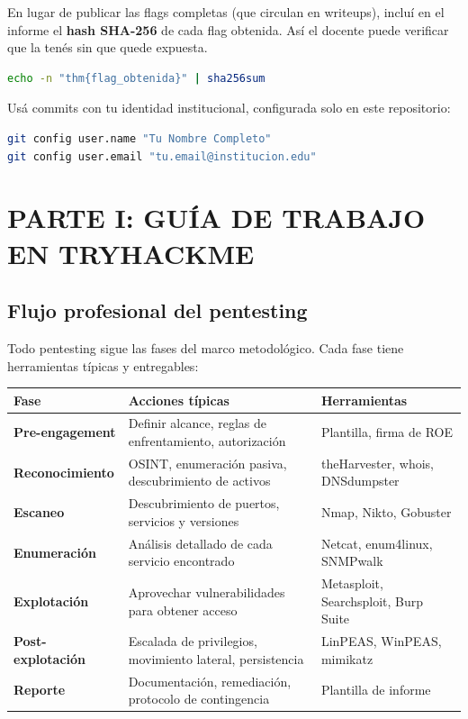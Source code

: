\documentclass[11pt,a4paper]{article}
\begin{document}
\begin{control}
En lugar de publicar las flags completas (que circulan en writeups), incluí en el informe el \textbf{hash SHA-256} de cada flag obtenida. Así el docente puede verificar que la tenés sin que quede expuesta.
\begin{lstlisting}[language=bash]
echo -n "thm{flag_obtenida}" | sha256sum
\end{lstlisting}
\end{control}

\begin{control}
Usá commits con tu identidad institucional, configurada solo en este repositorio:
\begin{lstlisting}[language=bash]
git config user.name "Tu Nombre Completo"
git config user.email "tu.email@institucion.edu"
\end{lstlisting}
\end{control}

\section{PARTE I: GUÍA DE TRABAJO EN TRYHACKME}

\subsection{Flujo profesional del pentesting}
Todo pentesting sigue las fases del marco metodológico. Cada fase tiene herramientas típicas y entregables:

\begin{center}
\small
\renewcommand{\arraystretch}{1.3}
\begin{tabularx}{\textwidth}{@{} p{2.7cm} X p{2.8cm} @{}}
\toprule
\textbf{Fase} & \textbf{Acciones típicas} & \textbf{Herramientas} \\
\midrule
\textbf{Pre-engagement} & Definir alcance, reglas de enfrentamiento, autorización & Plantilla, firma de ROE \\
\midrule
\textbf{Reconocimiento} & OSINT, enumeración pasiva, descubrimiento de activos & theHarvester, whois, DNSdumpster \\
\midrule
\textbf{Escaneo} & Descubrimiento de puertos, servicios y versiones & Nmap, Nikto, Gobuster \\
\midrule
\textbf{Enumeración} & Análisis detallado de cada servicio encontrado & Netcat, enum4linux, SNMPwalk \\
\midrule
\textbf{Explotación} & Aprovechar vulnerabilidades para obtener acceso & Metasploit, Searchsploit, Burp Suite \\
\midrule
\textbf{Post-explotación} & Escalada de privilegios, movimiento lateral, persistencia & LinPEAS, WinPEAS, mimikatz \\
\midrule
\textbf{Reporte} & Documentación, remediación, protocolo de contingencia & Plantilla de informe \\
\bottomrule
\end{tabularx}
\end{center}
\end{document}

